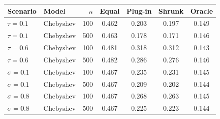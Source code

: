 \begin{tabular}{llrcccc}\toprule
Scenario & Model & $n$ & Equal & Plug-in & Shrunk & Oracle\\\midrule
$\tau{=}0.1$ & Chebyshev & 100 & 0.462 & 0.203 & 0.197 & 0.149\\
$\tau{=}0.1$ & Chebyshev & 500 & 0.463 & 0.178 & 0.171 & 0.146\\
$\tau{=}0.6$ & Chebyshev & 100 & 0.481 & 0.318 & 0.312 & 0.143\\
$\tau{=}0.6$ & Chebyshev & 500 & 0.482 & 0.286 & 0.276 & 0.146\\
$\sigma{=}0.1$ & Chebyshev & 100 & 0.467 & 0.235 & 0.231 & 0.145\\
$\sigma{=}0.1$ & Chebyshev & 500 & 0.467 & 0.209 & 0.202 & 0.144\\
$\sigma{=}0.8$ & Chebyshev & 100 & 0.467 & 0.268 & 0.263 & 0.145\\
$\sigma{=}0.8$ & Chebyshev & 500 & 0.467 & 0.225 & 0.223 & 0.144\\
\bottomrule\end{tabular}